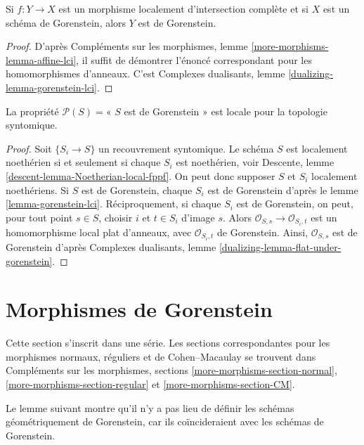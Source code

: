 \begin{lemma}
\label{lemma-gorenstein-lci}
Si $f : Y \to X$ est un morphisme localement d'intersection complète et si $X$ est un schéma de Gorenstein, alors $Y$ est de Gorenstein.
\end{lemma}

\begin{proof}
D'après Compléments sur les morphismes, lemme \ref{more-morphisms-lemma-affine-lci}, il suffit de démontrer l'énoncé correspondant pour les homomorphismes d'anneaux. C'est Complexes dualisants, lemme \ref{dualizing-lemma-gorenstein-lci}.
\end{proof}

\begin{lemma}
\label{lemma-gorenstein-local-syntomic}
La propriété $\mathcal{P}(S) =$« $S$ est de Gorenstein » est locale pour la topologie syntomique.
\end{lemma}

\begin{proof}
Soit $\{S_i \to S\}$ un recouvrement syntomique. Le schéma $S$ est localement noethérien si et seulement si chaque $S_i$ est noethérien, voir Descente, lemme \ref{descent-lemma-Noetherian-local-fppf}. On peut donc supposer $S$ et $S_i$ localement noethériens. Si $S$ est de Gorenstein, chaque $S_i$ est de Gorenstein d'après le lemme \ref{lemma-gorenstein-lci}. Réciproquement, si chaque $S_i$ est de Gorenstein, on peut, pour tout point $s \in S$, choisir $i$ et $t \in S_i$ d'image $s$. Alors $\mathcal{O}_{S, s} \to \mathcal{O}_{S_i, t}$ est un homomorphisme local plat d'anneaux, avec $\mathcal{O}_{S_i, t}$ de Gorenstein. Ainsi, $\mathcal{O}_{S, s}$ est de Gorenstein d'après Complexes dualisants, lemme \ref{dualizing-lemma-flat-under-gorenstein}.
\end{proof}






\section{Morphismes de Gorenstein}
\label{section-gorenstein-morphisms}

\noindent
Cette section s'inscrit dans une série. Les sections correspondantes pour les morphismes normaux, réguliers et de Cohen–Macaulay se trouvent dans Compléments sur les morphismes, sections \ref{more-morphisms-section-normal}, \ref{more-morphisms-section-regular} et \ref{more-morphisms-section-CM}.

\medskip\noindent
Le lemme suivant montre qu'il n'y a pas lieu de définir les schémas géométriquement de Gorenstein, car ils coïncideraient avec les schémas de Gorenstein.

